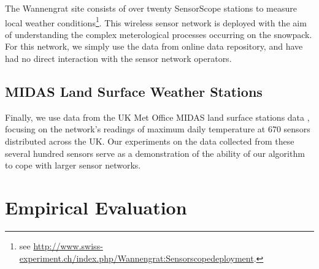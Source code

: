 \documentclass{acmsmall}
\begin{document}
The Wannengrat site consists of over twenty SensorScope stations to measure local weather conditions\footnote{see \url{http://www.swiss-experiment.ch/index.php/Wannengrat:Sensorscopedeployment}.}. This wireless sensor network is deployed with the aim of understanding the complex meterological processes occurring on the snowpack. For this network, we simply use the data from online data repository, and have had no direct interaction with the sensor network operators.

\subsection{MIDAS Land Surface Weather Stations}

Finally, we use data from the UK Met Office MIDAS land surface stations data \cite{MIDASdata}, focusing on the network's readings of maximum daily temperature at 670 sensors distributed across the UK. Our experiments on the data collected from these several hundred sensors serve as a demonstration of the ability of our algorithm to cope with larger sensor networks. 

\section{Empirical Evaluation}\label{sec_evaluation}
\end{document}
